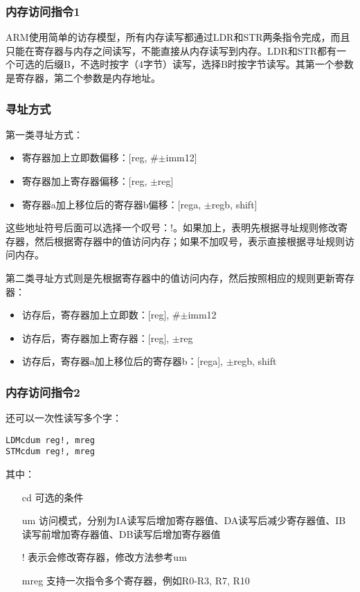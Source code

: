 \subsubsection{内存访问指令1}
ARM使用简单的访存模型，所有内存读写都通过LDR和STR两条指令完成，而且只能在寄存器与内存之间读写，不能直接从内存读写到内存。LDR和STR都有一个可选的后缀B，不选时按字（4字节）读写，选择B时按字节读写。其第一个参数是寄存器，第二个参数是内存地址。

\subsubsection{寻址方式}
第一类寻址方式：
\begin{itemize}
\item 寄存器加上立即数偏移：[reg, \#$\pm$imm12]
\item 寄存器加上寄存器偏移：[reg, $\pm$reg]
\item 寄存器a加上移位后的寄存器b偏移：[rega, $\pm$regb, shift]
\end{itemize}
这些地址符号后面可以选择一个叹号：!。如果加上，表明先根据寻址规则修改寄存器，然后根据寄存器中的值访问内存；如果不加叹号，表示直接根据寻址规则访问内存。

第二类寻址方式则是先根据寄存器中的值访问内存，然后按照相应的规则更新寄存器：
\begin{itemize}
\item 访存后，寄存器加上立即数：[reg], \#$\pm$imm12
\item 访存后，寄存器加上寄存器：[reg], $\pm$reg
\item 访存后，寄存器a加上移位后的寄存器b：[rega], $\pm$regb, shift
\end{itemize}

\subsubsection{内存访问指令2}
还可以一次性读写多个字：
\begin{lstlisting}[numbers=none]
LDMcdum reg!, mreg
STMcdum reg!, mreg
\end{lstlisting}
其中：
\begin{itemize}
\item[cd] 可选的条件
\item[um] 访问模式，分别为IA读写后增加寄存器值、DA读写后减少寄存器值、IB读写前增加寄存器值、DB读写后增加寄存器值
\item[!] 表示会修改寄存器，修改方法参考um
\item[mreg] 支持一次指令多个寄存器，例如{R0-R3, R7, R10}
\end{itemize}

